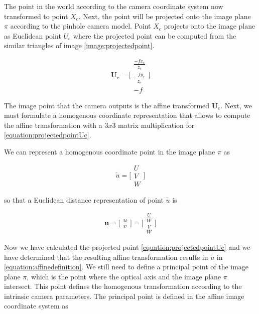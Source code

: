 \documentclass[12pt,a4paper,oneside,pdftex]{report}
\begin{document}
The point in the world according to the camera coordinate system now transformed to point
$X_c$. Next, the point will be projected onto the image plane $\pi$ according to the pinhole camera model. 
Point $X_c$ projects onto the image plane as Euclidean point $U_c$ where the projected point can be computed from the similar triangles of image \ref{image:projectedpoint}. 

\begin{equation}
\label{equation:projectedpointUc}
\textbf{U}_c = \Biggl[ \begin{array}{c}
\frac{-fx_c}{z_c} \\
\frac{-fy_c}{z_c} \\
-f \end{array} \Biggl]
\end{equation}

The image point that the camera outputs is the affine transformed $\textbf{U}_c$. Next, we must formulate a homogenous coordinate representation that allows to compute the affine transformation with a $3x3$ matrix multiplication for \ref{equation:projectedpointUc}.

We can represent a homogenous coordinate point in the image plane $\pi$ as 

\begin{equation}
\label{equation:affinedefinition}
\tilde{u} = \Biggl[ \begin{array}{c}
U \\
V \\
W \end{array} \Biggl]
\end{equation}

so that a Euclidean distance representation of point $\tilde{u}$ is 

\begin{equation}
\textbf{u} = \Biggl[ \begin{array}{c}
u \\
v \end{array} \Biggl] = \Biggl[ \begin{array}{c}
\frac{U}{W} \\
\frac{V}{W} \end{array} \Biggl]
\end{equation}

Now we have calculated the projected point \ref{equation:projectedpointUc} and we have determined that the resulting affine transformation results in $\tilde{u}$ in \ref{equation:affinedefinition}. We still need to define a principal point of the image plane $\pi$, which is the point where the optical axis and the image plane $\pi$ intersect. This point defines the homogenous transformation according to the intrinsic camera parameters. The principal point is defined in the affine image coordinate system as
\end{document}
